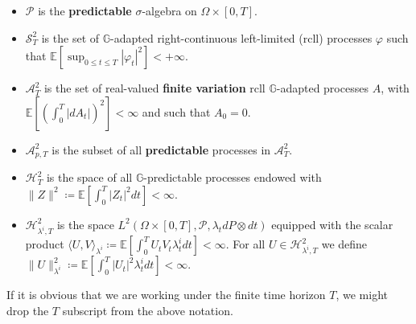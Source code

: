 \documentclass[11pt,a4paper]{article}
\numberwithin{equation}{section}
\theoremstyle{newPlain}
\theoremstyle{newDefinition}
\theoremstyle{newRemark}
\begin{document}
\begin{itemize}
	\item $\mathcal{P}$ is the \textbf{predictable} $\sigma$-algebra on $\Omega\times[0,T]$.
    \item $\mathcal{S}_T^2$ is the set of $\mathbb{G}$-adapted right-continuous left-limited (rcll) processes $\varphi$ such that $\mathbb{E}[\sup_{0\le t\le T}|\varphi_t|^2]<+\infty$.
    \item $\mathcal{A}_T^2$ is the set of real-valued \textbf{finite variation} rcll $\mathbb{G}$-adapted processes $A$, with $\mathbb{E}[(\int_0^T|dA_t|)^2]<\infty$ and such that  $A_0=0$.
    \item $\mathcal{A}_{p, T}^2$ is the subset of all \textbf{predictable} processes in $\mathcal{A}_T^2$.
    \item $\mathcal{H}_T^2$ is the space of all $\mathbb{G}$-predictable processes endowed with  $\|Z\|^2 \coloneqq \mathbb{E}[\int_0^T|Z_t|^2dt]<\infty$.
    \item $\mathcal{H}_{\lambda^i, T}^2$ is the space $L^2(\Omega \times [0,T], \mathcal{P}, \lambda_tdP\otimes dt)$ equipped with the scalar product $\langle U,V\rangle_{\lambda^i}\coloneqq\mathbb{E}[\int_0^TU_tV_t\lambda_t^idt]<\infty$. For all $U\in\mathcal{H}_{\lambda^i,T}^2$ we define $\|U\|_{\lambda^i}^2\coloneqq\mathbb{E}[\int_0^T|U_t|^2\lambda_t^idt]<\infty$.
\end{itemize}

If it is obvious that we are working under the finite time horizon $T$, we might drop the $T$ subscript from the above notation.
\end{document}
